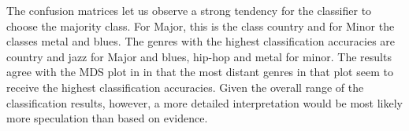 \documentclass{article}
\begin{document}
The confusion matrices let us observe a strong tendency for the classifier to choose the majority class. For Major, this is the class country and for Minor the classes metal and blues. 
The genres with the highest classification  accuracies are country and jazz for Major and blues, hip-hop and metal for minor. 
The results agree with the MDS plot in  in that the most distant genres in that plot seem to receive the highest classification accuracies. Given the overall range of the classification results, however, a more detailed interpretation would be most likely more speculation than based on evidence.

\begin{table}
\begin{center}
    \caption{Confusion matrix, Major keys}
    \label{tab:confMatMajPC}
  \end{center}
\end{table}
\end{document}
